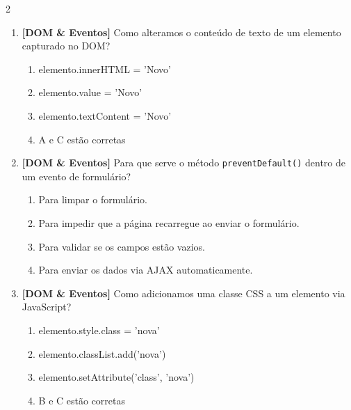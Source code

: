 \documentclass[a4paper,10pt]{article}
\begin{document}
\begin{multicols*}{2}
\begin{enumerate}[label=\textbf{\arabic*.}, resume, leftmargin=*]
\item \textbf{[DOM \& Eventos]} Como alteramos o conteúdo de texto de um elemento capturado no DOM?
\begin{enumerate}[label=(\alph*), noitemsep]
  \item elemento.innerHTML = 'Novo'
  \item elemento.value = 'Novo'
  \item elemento.textContent = 'Novo'
  \item A e C estão corretas
\end{enumerate}

\item \textbf{[DOM \& Eventos]} Para que serve o método \texttt{preventDefault()} dentro de um evento de formulário?
\begin{enumerate}[label=(\alph*), noitemsep]
  \item Para limpar o formulário.
  \item Para impedir que a página recarregue ao enviar o formulário.
  \item Para validar se os campos estão vazios.
  \item Para enviar os dados via AJAX automaticamente.
\end{enumerate}

\item \textbf{[DOM \& Eventos]} Como adicionamos uma classe CSS a um elemento via JavaScript?
\begin{enumerate}[label=(\alph*), noitemsep]
  \item elemento.style.class = 'nova'
  \item elemento.classList.add('nova')
  \item elemento.setAttribute('class', 'nova')
  \item B e C estão corretas
\end{enumerate}

\end{enumerate}
\end{multicols*}
\newpage
\end{document}
